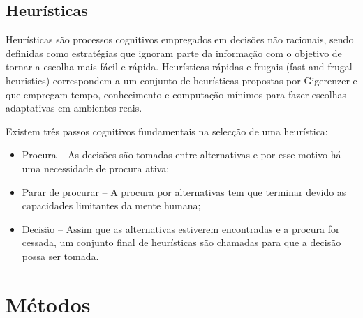 \documentclass[a4paper, 12pt]{article}
\begin{document}
\subsection{Heurísticas}

Heurísticas são processos cognitivos empregados em decisões não racionais, sendo definidas como estratégias 
que ignoram parte da informação com o objetivo de tornar a escolha mais fácil e rápida.
\cite{doi:10.1146/annurev-psych-120709-145346} Heurísticas rápidas e frugais (fast and frugal heuristics) correspondem a um conjunto de heurísticas 
propostas por Gigerenzer e que empregam tempo, conhecimento e computação mínimos para fazer escolhas 
adaptativas em ambientes reais.\cite{gigerenzer1999simple}

Existem três passos cognitivos fundamentais na selecção de uma heurística:
\begin{itemize}
    \item Procura – As decisões são tomadas entre alternativas e por esse motivo há uma necessidade de procura ativa;
    \item Parar de procurar – A procura por alternativas tem que terminar devido as capacidades limitantes da mente humana;
    \item Decisão – Assim que as alternativas estiverem encontradas e a procura for cessada, um conjunto final de heurísticas são chamadas para que a decisão possa ser tomada.\cite{gigerenzer1999simple}  
\end{itemize}
\clearpage

\section{Métodos}
\end{document}
